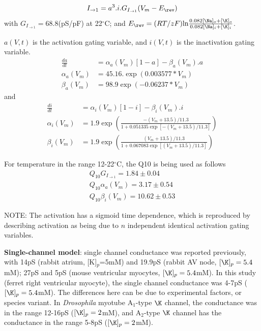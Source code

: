 \begin{equation}
I_{\to1}= a^3.i.G_{I_{\to1}} (V_m-E_\rev)
\end{equation}
with $G_{I_{\to1}}=68.8$(pS/pF) at 22$^\circ$C; and $E_\rev=(RT/zF)\ln
\frac{0.082[\Na]_o+[\K]_o}{0.082[\Na]_i+[\K]_i}$. 

$a(V,t)$ is the activation gating variable, and $i(V,t)$ is the inactivation
gating variable.
\begin{equation*}
\begin{split}
\frac{da}{dt} &= \alpha_a(V_m)\left[1 - a \right]-\beta_a(V_m).a \\
\alpha_a(V_m) &= 45.16.\exp\left( 0.003577*V_m \right) \\
\beta_a(V_m) &= 98.9 \exp\left( -0.06237*V_m \right)
\end{split}
\end{equation*}
and
\begin{equation}
\begin{split}
\frac{di}{dt} &= \alpha_i(V_m)\left[1 - i \right]-\beta_i (V_m).i \\
\alpha_i(V_m) &= 1.9 \exp\left( \frac{-(V_m+13.5)/11.3}{1+0.051335
\exp\left[-(V_m+13.5)/11.3\right]} \right)
\\
\beta_i(V_m) &= 1.9 \exp\left( \frac{(V_m+13.5)/11.3}{1+0.067083
\exp\left[(V_m+13.5)/11.3\right]} \right)
\end{split}
\end{equation}

For temperature in the range 12-22$^\circ$C, the Q10 is being used as follows
\begin{equation}
\begin{split}
Q_{10}G_{I_{\to1}}=1.84\pm 0.04 \\
Q_{10}\alpha_a(V_m)=3.17\pm 0.54 \\
Q_{10}\beta_i(V_m)=10.62\pm 0.53
\end{split}
\end{equation}


NOTE: The activation has a sigmoid time dependence, which is reproduced by
describing activation as being due to $n$ independent identical activation
gating variables. 

{\bf Single-channel model}: single channel conductance was reported previously,
with 14pS (rabbit atrium, [K]$_p$=5mM) and 19.9pS (rabbit AV node,
$[\K]_p=5.4$mM); 27pS and 5pS (mouse ventricular myocytes, $[\K]_p=5.4$mM). In
this study (ferret right ventricular myocyte), the single channel conductance
was 4-7pS ($[\K]_p=5.4$mM). The differences here can be due to experimental
factors, or species variant. In {\it Drosophila} myotube A$_1$-type $\K$
channel, the conductance was in the range 12-16pS ($[\K]_p=2$mM), and A$_2$-type
$\K$ channel has the conductance in the range 5-8pS ($[\K]_p=2$mM).


